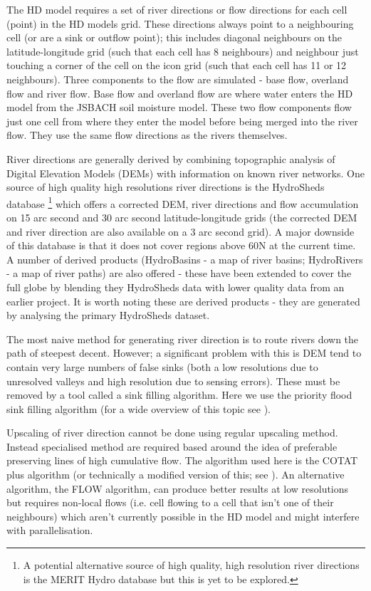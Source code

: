 \documentclass{article}
\begin{document}
The HD model requires a set of river directions or flow directions for each cell (point) in the HD models grid. These directions always point to a neighbouring cell (or are a sink or outflow point); this includes diagonal neighbours on the latitude-longitude grid (such that each cell has 8 neighbours) and neighbour just touching a corner of the cell on the icon grid (such that each cell has 11 or 12 neighbours). Three components to the flow are simulated - base flow, overland flow and river flow. Base flow and overland flow are where water enters the HD model from the JSBACH soil moisture model. These two flow components flow just one cell from where they enter the model before being merged into the river flow. They use the same flow directions as the rivers themselves.

River directions are generally derived by combining topographic analysis of Digital Elevation Models (DEMs) with information on known river networks. One source of high quality high resolutions river directions is the HydroSheds database \cite{doi:10.1029/2008EO100001}\footnote{A potential alternative source of high quality, high resolution river directions is the MERIT Hydro database\cite{doi:10.1029/2019WR024873} but this is yet to be explored.} which offers a corrected DEM, river directions and flow accumulation on 15 arc second and 30 arc second latitude-longitude grids (the corrected DEM and river direction are also available on a 3 arc second grid). A major downside of this database is that it does not cover regions above 60\degree N at the current time. A number of derived products (HydroBasins - a map of river basins; HydroRivers - a map of river paths) are also offered - these have been extended to cover the full globe by blending they HydroSheds data with lower quality data from an earlier project. It is worth noting these are derived products - they are generated by analysing the primary HydroSheds dataset.

The most naive method for generating river direction is to route rivers down the path of steepest decent. However; a significant problem with this is DEM tend to contain very large numbers of false sinks (both a low resolutions due to unresolved valleys and high resolution due to sensing errors). These must be removed by a tool called a sink filling algorithm. Here we use the priority flood sink filling algorithm (for a wide overview of this topic see \cite{barnes2014priority}).

Upscaling of river direction cannot be done using regular upscaling method. Instead specialised method are required based around the idea of preferable preserving lines of high cumulative flow. The algorithm used here is the COTAT plus algorithm\cite{WRCR:WRCR10603}  (or technically a modified version of this; see \cite{gmd-11-4291-2018}). An alternative algorithm, the FLOW algorithm\cite{hess-13-2241-2009}, can produce better results at low resolutions but requires non-local flows (i.e. cell flowing to a cell that isn't one of their neighbours) which aren't currently possible in the HD model and might interfere with parallelisation.
\end{document}
